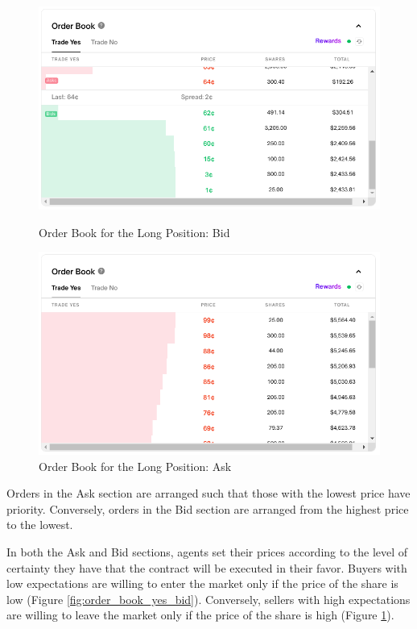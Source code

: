 \begin{figure}[htbp]
    \centering
    \begin{minipage}{.5\textwidth}
        \centering
        \includegraphics[scale=0.3]{img/order_book_yes_bid.png}
        \caption{Order Book for the Long Position: Bid}
        \label{fig:order_book_yes_bid}
    \end{minipage}%
    \begin{minipage}{.5\textwidth}
        \centering
        \includegraphics[scale=0.3]{img/order_book_yes_ask.png}
        \caption{Order Book for the Long Position: Ask}
        \label{fig:order_book_yes_ask}
    \end{minipage}
\end{figure}

Orders in the Ask section are arranged such that those with the lowest price have priority. Conversely, orders in the Bid section are arranged  from the highest price to the lowest.
    
In both the Ask and Bid sections, agents set their prices according to the level of certainty they have that the contract will be executed in their favor. Buyers with low expectations are willing to enter the market only if the price of the share is low (Figure \ref{fig:order_book_yes_bid}). Conversely, sellers with high expectations are willing to leave the market only if the price of the share is high (Figure \ref{fig:order_book_yes_ask}).